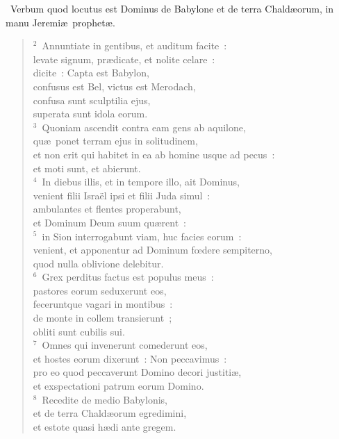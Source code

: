 ~\lettrine[lines=10,image=true,loversize=0.05,lraise=-0.03]{V}{}erbum quod locutus est Dominus de Babylone et de terra Chald\ae orum, in manu Jeremi\ae\ prophet\ae .
\begin{flushleft}\begin{verse}\vspace{6pt}${}^{2}$~Annuntiate in gentibus, et auditum facite~:\\ levate signum, pr\ae dicate, et nolite celare~:\\ dicite~: Capta est Babylon,\\ confusus est Bel, victus est Merodach,\\ confusa sunt sculptilia ejus,\\ superata sunt idola eorum.\\
${}^{3}$~Quoniam ascendit contra eam gens ab aquilone,\\ qu\ae\ ponet terram ejus in solitudinem,\\ et non erit qui habitet in ea ab homine usque ad pecus~:\\ et moti sunt, et abierunt.\\
${}^{4}$~In diebus illis, et in tempore illo, ait Dominus,\\ venient filii Isra\"el ipsi et filii Juda simul~:\\ ambulantes et flentes properabunt,\\ et Dominum Deum suum qu\ae rent~:\\
${}^{5}$~in Sion interrogabunt viam, huc facies eorum~:\\ venient, et apponentur ad Dominum fœdere sempiterno,\\ quod nulla oblivione delebitur.\\
${}^{6}$~Grex perditus factus est populus meus~:\\ pastores eorum seduxerunt eos,\\ feceruntque vagari in montibus~:\\ de monte in collem transierunt~;\\ obliti sunt cubilis sui.\\
${}^{7}$~Omnes qui invenerunt comederunt eos,\\ et hostes eorum dixerunt~: Non peccavimus~:\\ pro eo quod peccaverunt Domino decori justiti\ae ,\\ et exspectationi patrum eorum Domino.\\
${}^{8}$~Recedite de medio Babylonis,\\ et de terra Chald\ae orum egredimini,\\ et estote quasi h\ae di ante gregem.\\

\end{verse}
\end{flushleft}
